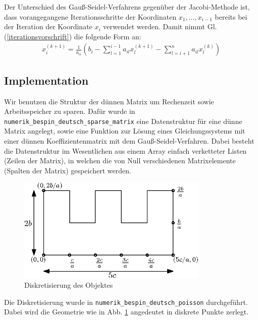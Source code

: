 \documentclass[10pt,a4paper]{article}
\begin{document}
Der Unterschied des Gauß-Seidel-Verfahrens gegenüber der Jacobi-Methode ist, dass vorangegangene Iterationsschritte der Koordinaten $x_1, \dots , x_{i-1}$ bereits bei der Iteration der Koordinate $x_i$ verwendet werden. Damit nimmt Gl. (\ref{iterationsvorschrift}) die folgende Form an:
\begin{align}
x_i^{(k+1)} = \frac{1}{a_{ii}}\left( b_i - \sum^{i-1}_{l=1} a_{il} x_l^{(k+1)} - \sum^{n}_{l=i+1} a_{il} x_l^{(k)} \right) 
\end{align}

\subsection{Implementation}
Wir benutzen die Struktur der dünnen Matrix um Rechenzeit sowie Arbeitsspeicher zu sparen. Dafür wurde in \texttt{numerik\_bespin\_deutsch\_sparse\_matrix} eine Datenstruktur für eine dünne Matrix angelegt, sowie eine Funktion zur Lösung eines Gleichungssystems mit einer dünnen Koeffizientenmatrix mit dem Gauß-Seidel-Verfahren. Dabei besteht die Datenstruktur im Wesentlichen aus einem Array einfach verketteter Listen (Zeilen der Matrix), in welchen die von Null verschiedenen Matrixelemente (Spalten der Matrix) gespeichert werden.

\begin{figure}
\centering
\includegraphics[height=5cm]{./figures/grid.eps}
\caption{Diskretisierung des Objektes}
\label{geometrie}
\end{figure}

Die Diskretisierung wurde in \texttt{numerik\_bespin\_deutsch\_poisson} durchgeführt. Dabei wird die Geometrie wie in Abb. \ref{geometrie} angedeutet in diskrete Punkte zerlegt.
\end{document}
